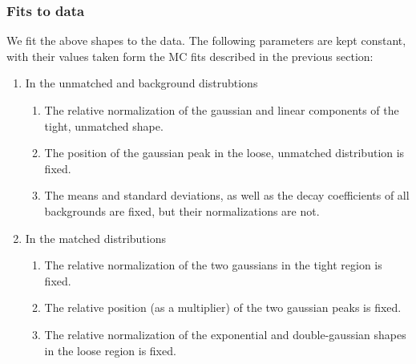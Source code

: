 \subsubsection{Fits to data}
We fit the above shapes to the data. The following parameters are kept constant, with their values taken form the MC fits described in the previous section:
\begin{enumerate}
\item In the unmatched and background distrubtions
	\begin{enumerate}
	\item The relative normalization of the gaussian and linear components of the tight, unmatched shape.
	\item The position of the gaussian peak in the loose, unmatched distribution is fixed.
	\item The means and standard deviations, as well as the decay coefficients of all backgrounds are fixed, but their normalizations are not.
	\end{enumerate}
\item In the matched distributions
        \begin{enumerate}
	\item The relative normalization of the two gaussians in the tight region is fixed.
	\item The relative position (as a multiplier) of the two gaussian peaks is fixed.
	\item The relative normalization of the exponential and double-gaussian shapes in the loose region is fixed.
        \end{enumerate}
\end{enumerate}

